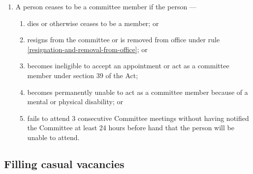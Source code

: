 \documentclass[../constitution.tex]{subfiles}
\begin{document}
\begin{enumerate}

\item A person ceases to be a committee member if the person ---

  \begin{enumerate}
  
  \item dies or otherwise ceases to be a member; or
  \item resigns from the committee or is removed from office under rule \ref{resignation-and-removal-from-office}; or
  \item becomes ineligible to accept an appointment or act as a committee member under section 39 of the Act;
  \item becomes permanently unable to act as a committee member because of a mental or physical disability; or
  \item fails to attend 3 consecutive Committee meetings without having notified the Committee at least 24 hours before hand that the person will be unable to attend. 
  \end{enumerate}
\end{enumerate}


\hypertarget{filling-casual-vacancies}{%
\subsection{Filling casual vacancies}\label{filling-casual-vacancies}}
\end{document}
